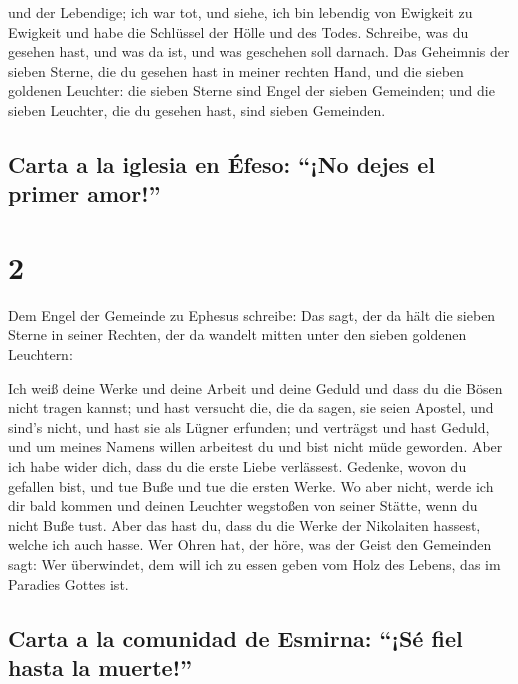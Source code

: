  und der Lebendige; ich war tot, und siehe, ich bin
lebendig von Ewigkeit zu Ewigkeit und habe die Schlüssel der Hölle und
des Todes.  Schreibe, was du gesehen hast, und was da
ist, und was geschehen soll darnach.  Das Geheimnis der
sieben Sterne, die du gesehen hast in meiner rechten Hand, und die
sieben goldenen Leuchter: die sieben Sterne sind Engel der sieben
Gemeinden; und die sieben Leuchter, die du gesehen hast, sind sieben
Gemeinden.

\hypertarget{carta-a-la-iglesia-en-uxe9feso-no-dejes-el-primer-amor}{%
\subsection{Carta a la iglesia en Éfeso: ``¡No dejes el primer
amor!''}\label{carta-a-la-iglesia-en-uxe9feso-no-dejes-el-primer-amor}}

\hypertarget{section-1}{%
\section{2}\label{section-1}}

 Dem Engel der Gemeinde zu Ephesus schreibe: Das sagt, der
da hält die sieben Sterne in seiner Rechten, der da wandelt mitten unter
den sieben goldenen Leuchtern:

 Ich weiß deine Werke und deine Arbeit und deine Geduld
und dass du die Bösen nicht tragen kannst; und hast versucht die, die da
sagen, sie seien Apostel, und sind's nicht, und hast sie als Lügner
erfunden;  und verträgst und hast Geduld, und um meines
Namens willen arbeitest du und bist nicht müde geworden. 
Aber ich habe wider dich, dass du die erste Liebe verlässest.
 Gedenke, wovon du gefallen bist, und tue Buße und tue die
ersten Werke. Wo aber nicht, werde ich dir bald kommen und deinen
Leuchter wegstoßen von seiner Stätte, wenn du nicht Buße tust.
 Aber das hast du, dass du die Werke der Nikolaiten
hassest, welche ich auch hasse.  Wer Ohren hat, der höre,
was der Geist den Gemeinden sagt: Wer überwindet, dem will ich zu essen
geben vom Holz des Lebens, das im Paradies Gottes ist.

\hypertarget{carta-a-la-comunidad-de-esmirna-suxe9-fiel-hasta-la-muerte}{%
\subsection{Carta a la comunidad de Esmirna: ``¡Sé fiel hasta la
muerte!''}\label{carta-a-la-comunidad-de-esmirna-suxe9-fiel-hasta-la-muerte}}

